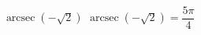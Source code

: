  {$\operatorname{arcsec} \left( -\sqrt{2} \right)$ }
{ $\operatorname{arcsec} \left( -\sqrt{2} \right) = \dfrac{5\pi}{4}$}
